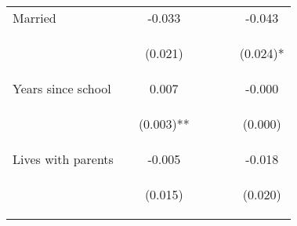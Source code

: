 \begin{tabular}{lcccccc}
\noalign{\smallskip}Married &  & -0.033 &  &  &  & -0.043\\
 & \begin{footnotesize}\end{footnotesize} & \begin{footnotesize}(0.021)\end{footnotesize} & \begin{footnotesize}\end{footnotesize} & \begin{footnotesize}\end{footnotesize} & \begin{footnotesize}\end{footnotesize} & \begin{footnotesize}(0.024)*\end{footnotesize}\\
\noalign{\smallskip}Years since school &  & 0.007 &  &  &  & -0.000\\
 & \begin{footnotesize}\end{footnotesize} & \begin{footnotesize}(0.003)**\end{footnotesize} & \begin{footnotesize}\end{footnotesize} & \begin{footnotesize}\end{footnotesize} & \begin{footnotesize}\end{footnotesize} & \begin{footnotesize}(0.000)\end{footnotesize}\\
\noalign{\smallskip}Lives with parents &  & -0.005 &  &  &  & -0.018\\
 & \begin{footnotesize}\end{footnotesize} & \begin{footnotesize}(0.015)\end{footnotesize} & \begin{footnotesize}\end{footnotesize} & \begin{footnotesize}\end{footnotesize} & \begin{footnotesize}\end{footnotesize} & \begin{footnotesize}(0.020)\end{footnotesize}\\

\end{tabular}
